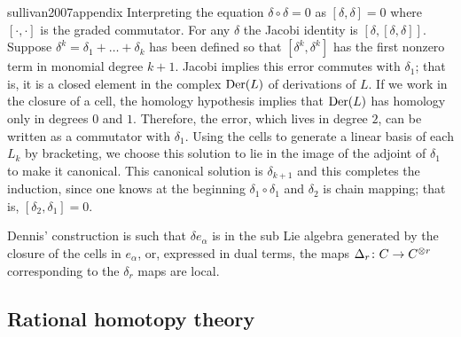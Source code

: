\begin{displaycquote}[p.251]{sullivan2007appendix}
	Interpreting the equation $\delta \circ \delta = 0$ as $[\delta, \delta] = 0$ where $[\cdot, \cdot]$ is the graded commutator.
	For any $\delta$ the Jacobi identity is $[\delta, [\delta, \delta]]$.
	Suppose $\delta^k = \delta_1 + \dots + \delta_k$ has been defined so that $[\delta^k, \delta^k]$ has the first nonzero term in monomial degree $k + 1$.
	Jacobi implies this error commutes with $\delta_1$; that is, it is a closed element in the complex $\mathrm{Der}(L)$ of derivations of $L$.
	If we work in the closure of a cell, the homology hypothesis implies that $\mathrm{Der}(L)$ has homology only in degrees $0$ and $1$.
	Therefore, the error, which lives in degree $2$, can be written as a commutator with $\delta_1$.
	Using the cells to generate a linear basis of each $L_k$ by bracketing, we choose this solution to lie in the image of the adjoint of $\delta_1$ to make it canonical.
	This canonical solution is $\delta_{k+1}$ and this completes the induction, since one knows at the beginning $\delta_1 \circ \delta_1$
	and $\delta_2$ is chain mapping; that is, $[\delta_2, \delta_1] = 0$.
\end{displaycquote}

Dennis' construction is such that $\delta e_\alpha$ is in the sub Lie algebra generated by the closure of the cells in $e_\alpha$, or, expressed in dual terms, the maps $\operatorname{\Delta}_r \colon C \to C^{\otimes r}$ corresponding to the $\delta_r$ maps are local.

\subsection{Rational homotopy theory}

